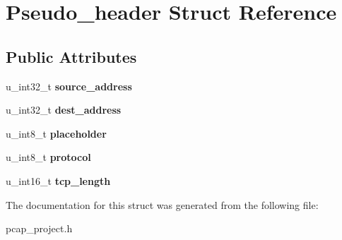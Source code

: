 \hypertarget{structPseudo__header}{}\section{Pseudo\+\_\+header Struct Reference}
\label{structPseudo__header}
\subsection*{Public Attributes}
\begin{DoxyCompactItemize}
\item 
\mbox{\label{structPseudo__header_abcfcf0d91f00822709f07d2f1a569eeb}} 
u\+\_\+int32\+\_\+t {\bfseries source\+\_\+address}
\item 
\mbox{\label{structPseudo__header_a08ba84c2dcfbdf4f8cb3f15cd12d277d}} 
u\+\_\+int32\+\_\+t {\bfseries dest\+\_\+address}
\item 
\mbox{\label{structPseudo__header_aacf49ba635f4de948a772de1470a76f3}} 
u\+\_\+int8\+\_\+t {\bfseries placeholder}
\item 
\mbox{\label{structPseudo__header_a17a2a5f515b056089063d10f8f198c15}} 
u\+\_\+int8\+\_\+t {\bfseries protocol}
\item 
\mbox{\label{structPseudo__header_a820c61fdb3db57762aea6d9cb5af61ff}} 
u\+\_\+int16\+\_\+t {\bfseries tcp\+\_\+length}
\end{DoxyCompactItemize}


The documentation for this struct was generated from the following file\+:\begin{DoxyCompactItemize}
\item 
pcap\+\_\+project.\+h\end{DoxyCompactItemize}

